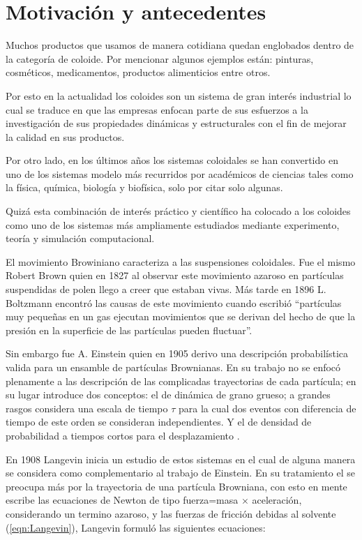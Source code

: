 \section{Motivaci\'on y antecedentes}
 
 
  Muchos productos que usamos de manera cotidiana quedan englobados dentro de la categor\'ia de coloide. 
  Por mencionar algunos ejemplos están: pinturas, cosm\'eticos,
  medicamentos, productos alimenticios entre otros. 
  
  Por esto en la actualidad los coloides son un sistema de gran inter\'es industrial lo cual se traduce 
   en que las empresas enfocan parte de sus esfuerzos a la investigaci\'on de sus propiedades din\'amicas
  y estructurales con el fin de mejorar la calidad en sus productos. 

  Por otro lado, en los \'ultimos a\~nos los sistemas coloidales se han convertido en uno 
  de los sistemas modelo m\'as recurridos por acad\'emicos de ciencias tales como la f\'isica,
  qu\'imica, biolog\'ia y biof\'isica, solo por citar solo algunas.

  Quiz\'a esta combinaci\'on de inter\'es pr\'actico y cient\'ifico ha
  colocado a los coloides como uno de los sistemas m\'as ampliamente estudiados
  mediante experimento, teor\'ia y simulaci\'on computacional.
  
  El movimiento Browiniano caracteriza a las suspensiones coloidales. Fue el mismo 
  Robert Brown quien en 1827 al observar este movimiento azaroso en partículas suspendidas de 
  polen llego a creer que estaban vivas. M\'as tarde en 1896 L. Boltzmann encontr\'o las causas de 
  este movimiento cuando escribi\'o \textquotedblleft partículas muy pequeñas en un gas ejecutan 
  movimientos que se derivan del hecho de que la presión en la superficie de las partículas pueden 
  fluctuar\textquotedblright.

  Sin embargo fue A. Einstein quien en 1905 derivo una descripci\'on probabil\'istica 
  valida para un ensamble de part\'iculas  Brownianas. En su trabajo no se enfoc\'o 
  plenamente a las descripci\'on de las complicadas trayectorias de cada part\'icula; 
  en su lugar introduce dos conceptos: el de dinámica de grano grueso; a grandes rasgos
  considera una escala de tiempo $\tau$ para la cual dos eventos con diferencia de tiempo
  de este orden se consideran independientes. Y el de densidad de probabilidad a tiempos 
  cortos para el desplazamiento \cite{ToraMigu97:Stocheffecphysysyste}.
  
  En 1908 Langevin  inicia un estudio de estos sistemas en el cual de alguna manera se considera como 
  complementario al trabajo de Einstein. En su tratamiento el se preocupa m\'as por la trayectoria de una 
  part\'icula Browniana, con esto en mente escribe las ecuaciones de Newton de tipo 
  fuerza=masa $\times$  aceleraci\'on, considerando un termino azaroso, y las fuerzas de fricci\'on debidas 
  al solvente (\ref{eqn:Langevin}), Langevin formul\'o las siguientes ecuaciones:
  
